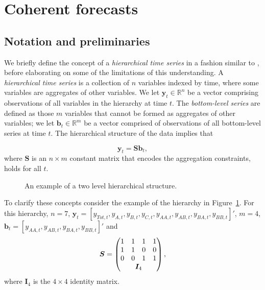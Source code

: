 \documentclass[12pt]{article}
\theoremstyle{definition}
\begin{document}
\section{Coherent forecasts}\label{sec:CoheForecasts}
	
	\subsection{Notation and preliminaries}\label{sec:notation}
	
    We briefly define the concept of a \emph{hierarchical time series} in a fashion similar to , before elaborating on some of the limitations of this understanding.  A \emph{hierarchical time series} is a collection of $n$ variables indexed by time, where some variables are aggregates of other variables. We let $\bm{y}_t \in \mathbb{R}^n$ be a vector comprising observations of all variables in the hierarchy at time $t$. The \emph{bottom-level series} are defined as those $m$ variables that cannot be formed as aggregates of other variables; we let $\bm{b}_t \in \mathbb{R}^m$ be a vector comprised of observations of all bottom-level series at time $t$.  The hierarchical structure of the data implies that 
    
    \begin{equation}
    \bm{y}_t = \bm{Sb}_t,
    \end{equation}
    where $\bm{S}$ is an $n \times m$ constant matrix that encodes the aggregation constraints, holds for all $t$.  
	
		\begin{figure}[H]
			\begin{center}
				 
				 
				\qobitree
			\end{center}
			\caption{An example of a two level hierarchical structure.}\label{fig:basichier}
		\end{figure}
	
	To clarify these concepts consider the example of the hierarchy in Figure~\ref{fig:basichier}.  For this hierarchy, $n=7$, $\bm{y}_t = [y_{Tot,t},y_{A,t}, y_{B,t},y_{C,t},y_{AA,t}, y_{AB,t}, y_{BA,t}, y_{BB,t}]'$, $m=4$, $\bm{b}_t = [y_{AA,t}, y_{AB,t}, y_{BA,t}, y_{BB,t}]'$ and
	\[
	\bm{S} = \begin{pmatrix}
	1 & 1 & 1 & 1  \\
	1 & 1 & 0 & 0 \\
	0 & 0 & 1 & 1 \\
	& \multicolumn{2}{c}{\bm{I}_4} &
	\end{pmatrix},
	\]
	where $\bm{I}_4$ is the $4\times 4$ identity matrix.
	
\end{document}
